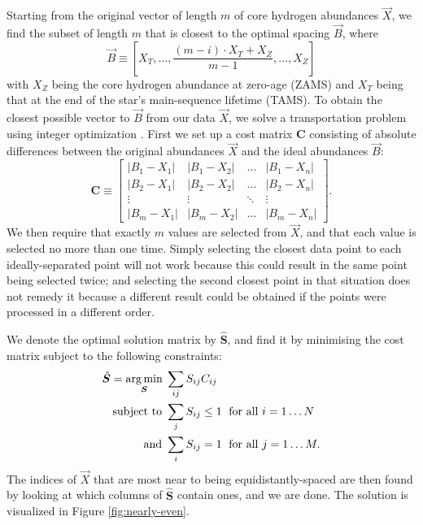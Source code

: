\documentclass[twocolumn,twocolappendix]{aastex6}
\newcommand\abs[1]{\left|#1\right|}
\begin{document}
Starting from the original vector of length $m$ of core hydrogen abundances $\vec X$, we find the subset of length $m$ that is closest to the optimal spacing $\vec B$, where
\begin{equation}
  \vec B \equiv \left[
    X_T, 
    \ldots, 
    \frac{(m-i)\cdot X_T + X_Z}{m-1}, 
    \ldots, 
    X_Z
  \right]
\end{equation}
with $X_Z$ being the core hydrogen abundance at zero-age (ZAMS) and $X_T$ being that at the end of the star's main-sequence lifetime (TAMS). To obtain the closest possible vector to $\vec B$ from our data $\vec X$, we solve a transportation problem using integer optimization \citep{23145595}. First we set up a cost matrix $\boldsymbol{C}$ consisting of absolute differences between the original abundances $\vec X$ and the ideal abundances $\vec B$:
\begin{equation} 
  \boldsymbol{C} \equiv \left[
  \begin{array}{cccc}
    \abs{B_1-X_1} & \abs{B_1-X_2} & \dots & \abs{B_1-X_n} \\
    \abs{B_2-X_1} & \abs{B_2-X_2} & \dots & \abs{B_2-X_n} \\
    \vdots & \vdots & \ddots & \vdots \\
    \abs{B_m-X_1} & \abs{B_m-X_2} & \dots & \abs{B_m-X_n}
  \end{array} \right].
\end{equation}
We then require that exactly $m$ values are selected from $\vec X$, and that each value is selected no more than one time. Simply selecting the closest data point to each ideally-separated point will not work because this could result in the same point being selected twice; and selecting the second closest point in that situation does not remedy it because a different result could be obtained if the points were processed in a different order. 

We denote the optimal solution matrix by $\hat{\boldsymbol{S}}$, and find it by minimising the cost matrix subject to the following constraints:
\begin{align}
  \hat{\boldsymbol{S}} = \underset{\boldsymbol S}{\arg\min} \; & \sum_{ij} S_{ij} C_{ij} \notag\\
  \text{subject to } & \sum_j S_{ij} \leq 1 \; \text{ for all } i=1\ldots N \notag\\
  \text{and } & \sum_i S_{ij} = 1 \; \text{ for all } j=1\ldots M.
  \label{eq:optimal-spacing}
\end{align}
The indices of $\vec X$ that are most near to being equidistantly-spaced are then found by looking at which columns of $\hat{\boldsymbol S}$ contain ones, and we are done. The solution is visualized in Figure \ref{fig:nearly-even}.
\end{document}
